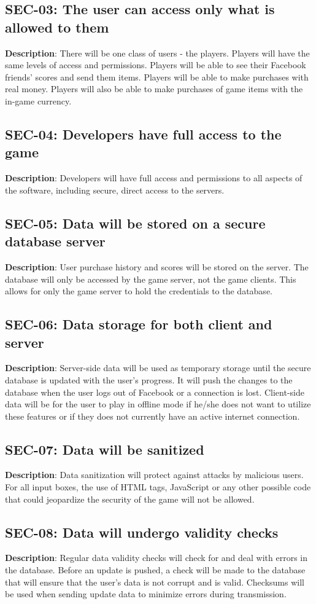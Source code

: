 \subsection{SEC-03: The user can access only what is allowed to them}
\textbf{Description}: There will be one class of users - the players. Players
will have the same levels of access and permissions. Players will
be able to see their Facebook friends\textquoteright{} scores and
send them items. Players will be able to make purchases with real
money. Players will also be able to make purchases of game items with
the in-game currency.
\subsection{SEC-04: Developers have full access to the game}
\textbf{Description}: Developers will have full access and permissions to all
aspects of the software, including secure, direct access to the servers.
\subsection{SEC-05: Data will be stored on a secure database server}
\textbf{Description}: User purchase history and scores will be stored on the
server. The database will only be accessed by the game server, not
the game clients. This allows for only the game server to hold the
credentials to the database. 
\subsection{SEC-06: Data storage for both client and server}
\textbf{Description}: Server-side data will be used as temporary storage until
the secure database is updated with the user\textquoteright{}s progress.
It will push the changes to the database when the user logs out of
Facebook or a connection is lost. Client-side data will be for the
user to play in offline mode if he/she does not want to utilize these
features or if they does not currently have an active internet connection.
\subsection{SEC-07: Data will be sanitized}
\textbf{Description}: Data sanitization will protect against attacks by malicious
users. For all input boxes, the use of HTML tags, JavaScript or any
other possible code that could jeopardize the security of the game
will not be allowed.
\subsection{SEC-08: Data will undergo validity checks}
\textbf{Description}: Regular data validity checks will check for and deal
with errors in the database. Before an update is pushed, a check will
be made to the database that will ensure that the user\textquoteright{}s
data is not corrupt and is valid. Checksums will be used when sending
update data to minimize errors during transmission.
